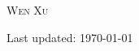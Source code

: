 \documentclass[10pt,letterpaper]{article}
\def\name{\textsc{Wen Xu}}
\begin{document}
{\Huge \name}


\vspace{0.15in}


% 









% 


% 
% 


\begin{center}
  \begin{small}
    Last updated: \today
  \end{small}
\end{center}
\end{document}
